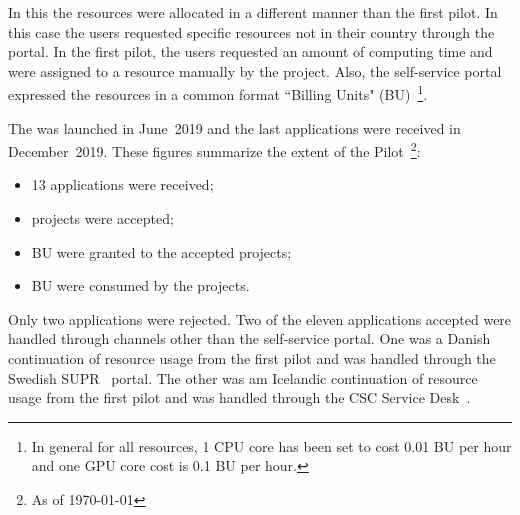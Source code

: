 
In this \pilot the resources were allocated in a different manner than the first pilot.
In this case the users requested specific resources not in their country through the portal. 
In the first pilot, the users requested an amount of computing time and were assigned to a resource manually by the \dell project.
Also, the self-service portal expressed the \einfra resources in a common format ``Billing Units" (BU)~\footnote{In general for all \dell resources, 1 CPU core has been set to cost 0.01 BU per hour and one GPU core cost is 0.1 BU per hour.}.

The \dell \pilot was launched in June~2019 and the last applications were received in December~2019. 
These figures summarize the extent of the Pilot~\footnote{As of \today}:
\begin{itemize}
\item 13 applications were received;
\item \accepted projects were accepted;
\item \BUalloc BU were granted to the accepted projects;
\item \BUcons BU were consumed by the projects.
\end{itemize}
Only two applications were rejected. 
Two of the eleven applications accepted were handled through channels other than the self-service portal.
One was a Danish continuation of resource usage from the first \dell pilot and was handled through the Swedish SUPR~\cite{supr} portal.
The other was am Icelandic continuation of resource usage from the first \dell pilot and was handled through the CSC Service Desk~\cite{csc-service-desk}.

